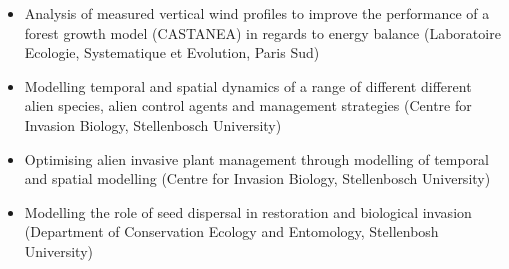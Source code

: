 \documentclass[a4paper]{article}
\begin{document}
\begin{itemize}[leftmargin=1.1in]
\item Analysis of measured vertical wind profiles to improve the
	performance of a forest growth model (CASTANEA) in regards to energy
	balance (Laboratoire Ecologie, Systematique et Evolution, Paris
	Sud)

\item Modelling temporal and spatial dynamics of a range of different
	different alien species, alien control agents and management
	strategies (Centre for Invasion Biology, Stellenbosch
	University)

\item Optimising alien invasive plant management through modelling of
	temporal and spatial modelling (Centre for Invasion Biology,
	Stellenbosch University)

\item Modelling the role of seed dispersal in restoration and
	biological invasion (Department of Conservation Ecology and
	Entomology, Stellenbosh University)

\end{itemize}
\end{document}
